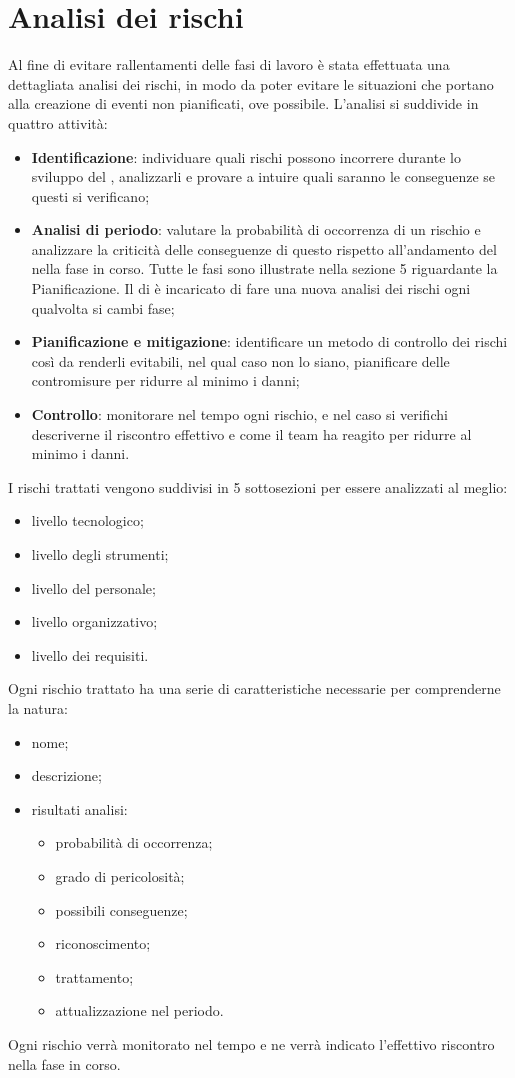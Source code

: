 \documentclass[PianoDiProgetto.tex]{subfiles}
\begin{document}
\section{Analisi dei rischi}
Al fine di evitare rallentamenti delle fasi di lavoro è stata effettuata una dettagliata analisi dei rischi, in modo da poter evitare le situazioni che portano alla creazione di eventi non pianificati, ove possibile. L'analisi si suddivide in quattro attività:
	\begin{itemize}
		\item \textbf{Identificazione}: individuare quali rischi possono incorrere durante lo sviluppo del , analizzarli e provare a intuire quali saranno le conseguenze se questi si verificano;
		\item \textbf{Analisi di periodo}: valutare la probabilità di occorrenza di un rischio e analizzare la criticità delle conseguenze di questo rispetto all'andamento del  nella fase in corso. Tutte le fasi sono illustrate nella sezione 5 riguardante la Pianificazione. Il \RESP{} di  è incaricato  di fare una nuova analisi dei rischi ogni qualvolta si cambi fase;
		\item \textbf{Pianificazione e mitigazione}: identificare un metodo di controllo dei rischi così da renderli evitabili, nel qual caso non lo siano, pianificare delle contromisure per ridurre al minimo i danni; 
		\item \textbf{Controllo}: monitorare nel tempo ogni rischio, e nel caso si verifichi descriverne il riscontro effettivo e come il team ha reagito per ridurre al minimo i danni. 
	\end{itemize}
I rischi trattati vengono suddivisi in 5 sottosezioni per essere analizzati al meglio:
	\begin{itemize}
		\item livello tecnologico;
		\item livello degli strumenti;
		\item livello del personale;
		\item livello organizzativo;
		\item livello dei requisiti.
	\end{itemize}
Ogni rischio trattato ha una serie di caratteristiche necessarie per comprenderne la natura:
	\begin{itemize}
		\item nome;
		\item descrizione;
		\item risultati analisi:
			\begin{itemize}
				\item probabilità di occorrenza;
				\item grado di pericolosità;
				\item possibili conseguenze;
				\item riconoscimento;
				\item trattamento;
				\item attualizzazione nel periodo.
			\end{itemize}
	\end{itemize}
Ogni rischio verrà monitorato nel tempo e ne verrà indicato l'effettivo riscontro nella fase in corso.
\end{document}
